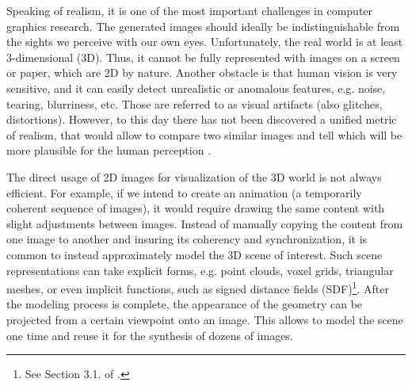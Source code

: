 Speaking of realism, it is one of the most important challenges in computer graphics research. The generated images should ideally be indistinguishable from the sights we perceive with our own eyes. Unfortunately, the real world is at least 3-dimensional (3D). Thus, it cannot be fully represented with images on a screen or paper, which are 2D by nature. Another obstacle is that human vision is very sensitive, and it can easily detect unrealistic or anomalous features, e.g. noise, tearing, blurriness, etc. Those are referred to as visual artifacts (also glitches, distortions). However, to this day there has not been discovered a unified metric of realism, that would allow to compare two similar images and tell which will be more plausible for the human perception \cite{metric:wang11}.

The direct usage of 2D images for visualization of the 3D world is not always efficient. For example, if we intend to create an animation (a temporarily coherent sequence of images), it would require drawing the same content with slight adjustments between images. Instead of manually copying the content from one image to another and insuring its coherency and synchronization, it is common to instead approximately model the 3D scene of interest. Such scene representations can take explicit forms, e.g. point clouds, voxel grids, triangular meshes, or even implicit functions, such as signed distance fields (SDF)\cite{survey:advances-nn22}\footnote{See Section 3.1. of \cite{survey:advances-nn22}.}\label{intro:3d-representations-paragraph}. After the modeling process is complete, the appearance of the geometry can be projected from a certain viewpoint onto an image. This allows to model the scene one time and reuse it for the synthesis of dozens of images.



